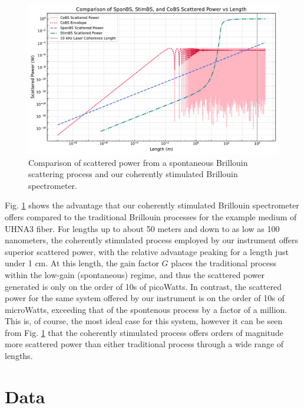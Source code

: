 \begin{figure}[t]
\centering
\includegraphics[width=\textwidth]{figs/4-CABS/SponBSvsStimBSvsCoBS.pdf}
\caption{Comparison of scattered power from a spontaneous Brillouin scattering process and our coherently stimulated Brillouin spectrometer.}
\label{fig:SponBSvsStimBSvsCoBS}
\end{figure}

Fig. \ref{fig:SponBSvsStimBSvsCoBS} shows the advantage that our coherently stimulated Brillouin spectrometer offers compared to the traditional Brillouin processes for the example medium of UHNA3 fiber. For lengths up to about 50 meters and down to as low as 100 nanometers, the coherently stimulated process employed by our instrument offers superior scattered power, with the relative advantage peaking for a length just under 1 cm. At this length, the gain factor $G$ places the traditional process within the low-gain (spontaneous) regime, and thus the scattered power generated is only on the order of 10s of picoWatts. In contrast, the scattered power for the same system offered by our instrument is on the order of 10s of microWatts, exceeding that of the spontenous process by a factor of a million. This is, of course, the most ideal case for this system, however it can be seen from Fig. \ref{fig:SponBSvsStimBSvsCoBS} that the coherently stimulated process offers orders of magnitude more scattered power than either traditional process through a wide range of lengths.

\section{Data}
